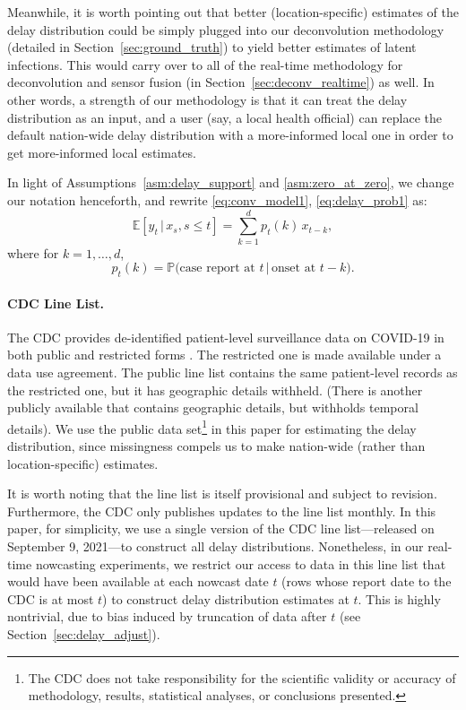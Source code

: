 \documentclass[sts]{imsart}
\def\E{\mathbb{E}}
\def\P{\mathbb{P}}
\theoremstyle{plain}
\theoremstyle{definition}
\theoremstyle{remark}
\begin{document}
Meanwhile, it is worth pointing out that better (location-specific) estimates of
the delay distribution could be simply plugged into our deconvolution
methodology (detailed in Section~\ref{sec:ground_truth}) to yield better
estimates of latent infections. This would carry over to all of the real-time  
methodology for deconvolution and sensor fusion (in
Section~\ref{sec:deconv_realtime}) as well. In other words, a strength of our
methodology is that it can treat the delay distribution as an input, and a user
(say, a local health official) can replace the default nation-wide delay
distribution with a more-informed local one in order to get more-informed local 
estimates. 

In light of Assumptions~\ref{asm:delay_support} and \ref{asm:zero_at_zero}, we
change our notation henceforth, and rewrite \eqref{eq:conv_model1},
\eqref{eq:delay_prob1} as: 
\begin{equation}
\label{eq:conv_model2}
\E[y_t \,|\, x_s, s \leq t] = \sum_{k=1}^d p_t(k) \, x_{t-k},  
\end{equation}
where for $k=1,\ldots,d$,
\begin{equation}
\label{eq:delay_prob2}
p_t(k) = \P\big( \text{case report at $t$} \,|\, \text{onset at $t-k$} \big). 
\end{equation}

\smallskip
\paragraph*{CDC Line List.}

The CDC provides de-identified patient-level surveillance data on COVID-19 in
both public and restricted forms \citep{cdc_public, cdc_restricted}. The
restricted one is made available under a data use agreement. The public line
list contains the same patient-level records as the restricted one, but it has
geographic details withheld. (There is another publicly available that contains
geographic details, but withholds temporal details). We use the public data
set\footnote{The CDC does not take responsibility for the scientific validity or
  accuracy of methodology, results, statistical analyses, or conclusions
  presented.} 
in this paper for estimating the delay distribution, since missingness compels
us to make nation-wide (rather than location-specific) estimates.

It is worth noting that the line list is itself provisional and subject to
revision. Furthermore, the CDC only publishes updates to the line list
monthly. In this paper, for simplicity, we use a single version of the CDC line
list---released on September 9, 2021---to construct all delay
distributions. Nonetheless, in our real-time nowcasting experiments, we 
restrict our access to data in this line list that would have been available at
each nowcast date $t$ (rows whose report date to the CDC is at most $t$) to
construct delay distribution estimates at $t$. This is highly nontrivial, due to
bias induced by truncation of data after $t$ (see
Section~\ref{sec:delay_adjust}). 
\end{document}
